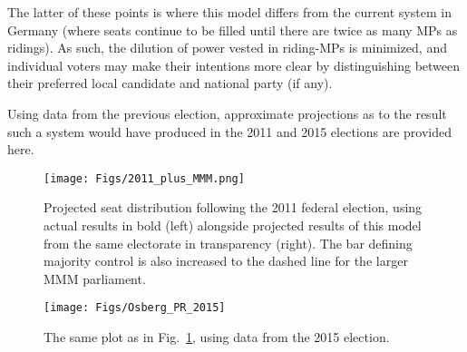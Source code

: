\documentclass[DIV=calc, paper=a4, fontsize=11pt, twocolumn]{scrartcl}	 %
\begin{document}
The latter of these points is where this model differs from the current system in Germany (where seats continue to be filled until there are twice as many MPs as ridings). As such, the dilution of power vested in riding-MPs is minimized,  and individual voters may make their intentions more clear by distinguishing between their preferred local candidate and national party (if any).

Using data from the previous election, approximate projections as to the result such a system would have produced in the 2011 and 2015 elections are provided here.


\begin{figure}[h!]
  \texttt{[image: Figs/2011\_plus\_MMM.png]}
  \caption{Projected seat distribution following the 2011 federal election, using actual results in bold (left) alongside projected results of this model from the same electorate in transparency (right). The bar defining majority control is also increased to the dashed line for the larger MMM parliament.
}
\label{fig:hypo_2011_sum}
\end{figure}


\begin{figure}[h!]
  \texttt{[image: Figs/Osberg\_PR\_2015]}
  \caption{The same plot as in Fig.~\ref{fig:hypo_2011_sum}, using data from the 2015 election.}
\label{fig:hypo_2015_sum}
\end{figure}

\pagebreak

\maketitle %
\thispagestyle{fancy} %

\end{document}
